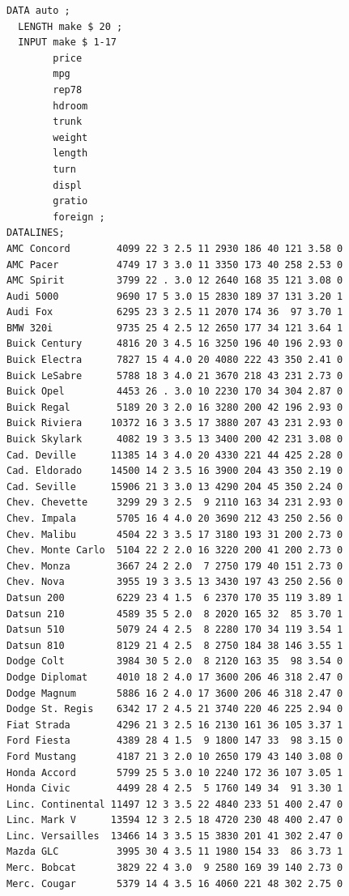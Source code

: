 \documentclass[
]{book}
\begin{document}
\begin{verbatim}
DATA auto ;
  LENGTH make $ 20 ;
  INPUT make $ 1-17 
        price 
        mpg 
        rep78 
        hdroom 
        trunk 
        weight 
        length 
        turn
        displ 
        gratio 
        foreign ;
DATALINES;
AMC Concord        4099 22 3 2.5 11 2930 186 40 121 3.58 0
AMC Pacer          4749 17 3 3.0 11 3350 173 40 258 2.53 0
AMC Spirit         3799 22 . 3.0 12 2640 168 35 121 3.08 0
Audi 5000          9690 17 5 3.0 15 2830 189 37 131 3.20 1
Audi Fox           6295 23 3 2.5 11 2070 174 36  97 3.70 1
BMW 320i           9735 25 4 2.5 12 2650 177 34 121 3.64 1
Buick Century      4816 20 3 4.5 16 3250 196 40 196 2.93 0
Buick Electra      7827 15 4 4.0 20 4080 222 43 350 2.41 0
Buick LeSabre      5788 18 3 4.0 21 3670 218 43 231 2.73 0
Buick Opel         4453 26 . 3.0 10 2230 170 34 304 2.87 0
Buick Regal        5189 20 3 2.0 16 3280 200 42 196 2.93 0
Buick Riviera     10372 16 3 3.5 17 3880 207 43 231 2.93 0
Buick Skylark      4082 19 3 3.5 13 3400 200 42 231 3.08 0
Cad. Deville      11385 14 3 4.0 20 4330 221 44 425 2.28 0
Cad. Eldorado     14500 14 2 3.5 16 3900 204 43 350 2.19 0
Cad. Seville      15906 21 3 3.0 13 4290 204 45 350 2.24 0
Chev. Chevette     3299 29 3 2.5  9 2110 163 34 231 2.93 0
Chev. Impala       5705 16 4 4.0 20 3690 212 43 250 2.56 0
Chev. Malibu       4504 22 3 3.5 17 3180 193 31 200 2.73 0
Chev. Monte Carlo  5104 22 2 2.0 16 3220 200 41 200 2.73 0
Chev. Monza        3667 24 2 2.0  7 2750 179 40 151 2.73 0
Chev. Nova         3955 19 3 3.5 13 3430 197 43 250 2.56 0
Datsun 200         6229 23 4 1.5  6 2370 170 35 119 3.89 1
Datsun 210         4589 35 5 2.0  8 2020 165 32  85 3.70 1
Datsun 510         5079 24 4 2.5  8 2280 170 34 119 3.54 1
Datsun 810         8129 21 4 2.5  8 2750 184 38 146 3.55 1
Dodge Colt         3984 30 5 2.0  8 2120 163 35  98 3.54 0
Dodge Diplomat     4010 18 2 4.0 17 3600 206 46 318 2.47 0
Dodge Magnum       5886 16 2 4.0 17 3600 206 46 318 2.47 0
Dodge St. Regis    6342 17 2 4.5 21 3740 220 46 225 2.94 0
Fiat Strada        4296 21 3 2.5 16 2130 161 36 105 3.37 1
Ford Fiesta        4389 28 4 1.5  9 1800 147 33  98 3.15 0
Ford Mustang       4187 21 3 2.0 10 2650 179 43 140 3.08 0
Honda Accord       5799 25 5 3.0 10 2240 172 36 107 3.05 1
Honda Civic        4499 28 4 2.5  5 1760 149 34  91 3.30 1
Linc. Continental 11497 12 3 3.5 22 4840 233 51 400 2.47 0
Linc. Mark V      13594 12 3 2.5 18 4720 230 48 400 2.47 0
Linc. Versailles  13466 14 3 3.5 15 3830 201 41 302 2.47 0
Mazda GLC          3995 30 4 3.5 11 1980 154 33  86 3.73 1
Merc. Bobcat       3829 22 4 3.0  9 2580 169 39 140 2.73 0
Merc. Cougar       5379 14 4 3.5 16 4060 221 48 302 2.75 0

\end{verbatim}
\end{document}
